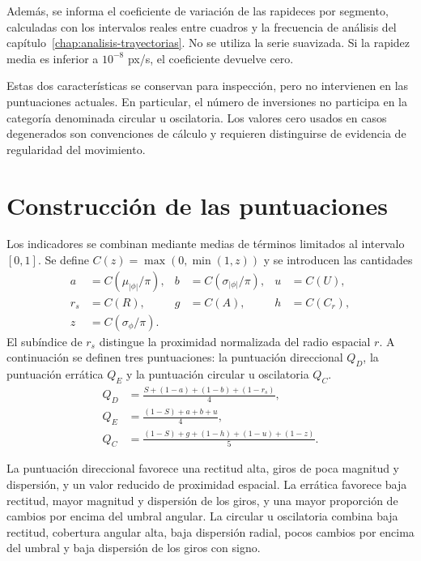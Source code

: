 Además, se informa el coeficiente de variación de las rapideces por segmento, calculadas con los intervalos reales entre cuadros y la frecuencia de análisis del capítulo~\ref{chap:analisis-trayectorias}. No se utiliza la serie suavizada. Si la rapidez media es inferior a $10^{-8}$ px/s, el coeficiente devuelve cero.

Estas dos características se conservan para inspección, pero no intervienen en las puntuaciones actuales. En particular, el número de inversiones no participa en la categoría denominada circular u oscilatoria. Los valores cero usados en casos degenerados son convenciones de cálculo y requieren distinguirse de evidencia de regularidad del movimiento.

\section{Construcción de las puntuaciones}

Los indicadores se combinan mediante medias de términos limitados al intervalo $[0,1]$. Se define $C(z)=\max(0,\min(1,z))$ y se introducen las cantidades
\begin{equation}
\begin{aligned}
 a&=C(\mu_{|\phi|}/\pi), & b&=C(\sigma_{|\phi|}/\pi),
 &u&=C(U),\\
 r_s&=C(R), & g&=C(A), &h&=C(C_r),\\
 z&=C(\sigma_\phi/\pi).
\end{aligned}
\end{equation}
El subíndice de $r_s$ distingue la proximidad normalizada del radio espacial $r$. A continuación se definen tres puntuaciones: la puntuación direccional $Q_D$, la puntuación errática $Q_E$ y la puntuación circular u oscilatoria $Q_C$.
\begin{equation}
\begin{aligned}
 Q_D&=\frac{S+(1-a)+(1-b)+(1-r_s)}{4},\\[0.3em]
 Q_E&=\frac{(1-S)+a+b+u}{4},\\[0.3em]
 Q_C&=\frac{(1-S)+g+(1-h)+(1-u)+(1-z)}{5}.
\end{aligned}
\label{eq:puntuaciones-movimiento}
\end{equation}

La puntuación direccional favorece una rectitud alta, giros de poca magnitud y dispersión, y un valor reducido de proximidad espacial. La errática favorece baja rectitud, mayor magnitud y dispersión de los giros, y una mayor proporción de cambios por encima del umbral angular. La circular u oscilatoria combina baja rectitud, cobertura angular alta, baja dispersión radial, pocos cambios por encima del umbral y baja dispersión de los giros con signo.


